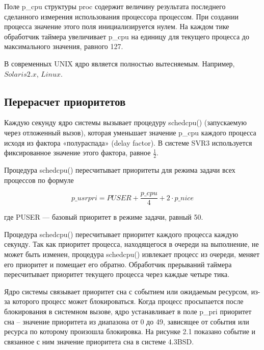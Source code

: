             Поле  p\_cpu  структуры  proc  содержит  величину  результата  последнего  сделанного  измерения  использования  процессора  процессом.  При  создании  процесса  значение  этого  поля  инициализируется  нулем.  На  каждом  тике  обработчик  таймера  увеличивает  p\_cpu  на  единицу  для  текущего  процесса  до  максимального  значения,  равного  127.
            
            В современных UNIX ядро является полностью вытесняемым. Например, \(Solaris 2.x\), \(Linux\).

        \subsection{Перерасчет приоритетов}
            Каждую  секунду  ядро  системы  вызывает  процедуру  schedcpu()  (запускаемую  через  отложенный  вызов),  которая  уменьшает  значение  p\_cpu  каждого  процесса  исходя  из  фактора  «полураспада»  (delay factor).  В  системе  SVR3  используется  фиксированное  значение  этого  фактора,  равное \(\frac{1}{2}\).  
            
            Процедура  schedcpu()  пересчитывает  приоритеты  для  режима  задачи  всех  процессов  по  формуле
            
            \[
            p\_usrpri = PUSER + \frac{p\_cpu}{4} + 2 \cdot p\_nice
            \]
            
            где  PUSER  —  базовый  приоритет  в  режиме  задачи,  равный  50.  
            
            Процедура  schedcpu()  пересчитывает  приоритет  каждого  процесса  каждую  секунду.  Так  как  приоритет  процесса,  находящегося  в  очереди  на  выполнение,  не  может  быть  изменен,  процедура  schedcpu()  извлекает  процесс  из  очереди,  меняет  его  приоритет  и  помещает  его  обратно.  Обработчик  прерываний  таймера  пересчитывает  приоритет  текущего  процесса  через  каждые  четыре  тика. 

            Ядро системы связывает приоритет сна с событием или ожидаемым ресурсом, из-за которого процесс может блокироваться. Когда процесс просыпается после блокирования в системном вызове, ядро устанавливает в поле p\_pri приоритет сна – значение приоритета из диапазона от 0 до 49, зависящее от события или ресурса по которому произошла блокировка. На рисунке 2.1 показано событие и связанное с ним значение приоритета сна в системе 4.3BSD.
            
            
